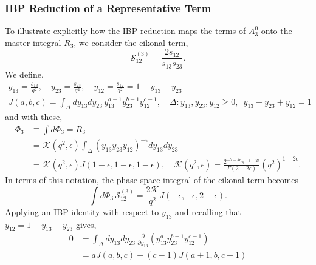 \subsubsection*{IBP Reduction of a Representative Term}

To illustrate explicitly how the IBP reduction maps the terms of $A_3^0$ onto the master integral $R_3$,
we consider the eikonal term,
\begin{equation}
    \mathcal S_{12}^{(3)} = \frac{2s_{12}}{s_{13}s_{23}}.
\end{equation}
We define,
\begin{equation}
    \begin{gathered}
        y_{13} = \frac{s_{13}}{q^2},\quad y_{23} = \frac{s_{23}}{q^2},\quad y_{12} = \frac{s_{12}}{q^2} = 1 - y_{13} - y_{23}\\
        J(a,b,c) = \int_\Delta dy_{13} dy_{23}\, y_{13}^{a-1}y_{23}^{b-1}y_{12}^{c-1},\quad \Delta:y_{13},y_{23},y_{12}\geq0,\,\,\,y_{13}+y_{23}+y_{12}=1
    \end{gathered}
\end{equation}
and with these,
\begin{equation}
    \begin{split}
        \Phi_3 &\equiv \int d\Phi_3 = R_3\\
               &= \mathcal K\!\left(q^2,\epsilon\right)\int_\Delta(y_{13}y_{23}y_{12})^{-\epsilon}dy_{13}dy_{23}\\
               &= \mathcal K\!\left(q^2,\epsilon\right)J(1-\epsilon,1-\epsilon,1-\epsilon),\quad \mathcal K\!\left(q^2,\epsilon\right) = \frac{2^{-7+4\epsilon}\pi^{-3+2\epsilon}}{\Gamma(2-2\epsilon)}\!\left(q^2\right)^{1-2\epsilon}.
    \end{split}
\end{equation}
In terms of this notation, the phase-space integral of the eikonal term becomes
\begin{equation}
    \int d\Phi_3\,\mathcal S_{12}^{(3)} = \frac{2\mathcal K}{q^2}J(-\epsilon,-\epsilon,2-\epsilon).
\end{equation}
Applying an IBP identity with respect to $y_{13}$ and recalling that $y_{12}=1-y_{13}-y_{23}$ gives, 
\begin{equation}
    \begin{split}
        0 &= \int_\Delta dy_{13} dy_{23}\,\frac\partial{\partial y_{13}}\!\left(y_{13}^a y_{23}^{b-1} y_{12}^{c-1}\right)\\
          &= aJ(a,b,c) - (c-1)J(a+1,b,c-1)
    \end{split}
\end{equation}
